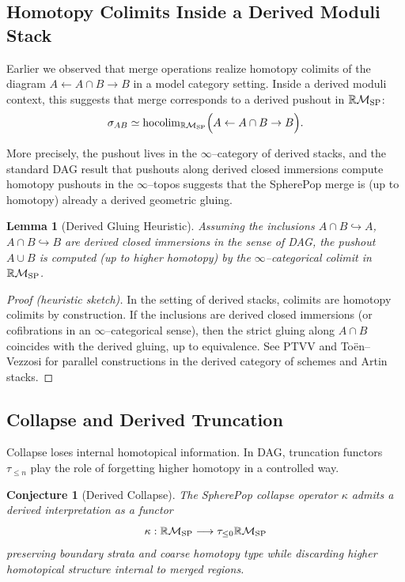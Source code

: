 \documentclass[12pt]{article}
\theoremstyle{plain}
\newtheorem{lemma}[theorem]{Lemma}
\newtheorem{conjecture_env}[theorem]{Conjecture}
\theoremstyle{definition}
\theoremstyle{remark}
\begin{document}
\subsection{Homotopy Colimits Inside a Derived Moduli Stack}

Earlier we observed that merge operations realize homotopy colimits of the
diagram $A \leftarrow A\cap B\rightarrow B$ in a model category setting.
Inside a derived moduli context, this suggests that merge corresponds to a
derived pushout in $\mathbb{R}\mathcal{M}_{\rm SP}$:
\[
    \sigma_{AB}
    \simeq
    \mathrm{hocolim}_{\mathbb{R}\mathcal{M}_{\rm SP}}
    \Bigl( A \leftarrow A\cap B \rightarrow B \Bigr).
\]

More precisely, the pushout lives in the $\infty$--category of derived stacks,
and the standard DAG result that pushouts along derived closed immersions
compute homotopy pushouts in the $\infty$--topos suggests that the SpherePop
merge is (up to homotopy) already a derived geometric gluing.


\begin{lemma}[Derived Gluing Heuristic]
Assuming the inclusions $A\cap B\hookrightarrow A$, $A\cap B\hookrightarrow B$
are derived closed immersions in the sense of DAG, the pushout
$A\cup B$ is computed (up to higher homotopy) by the $\infty$--categorical
colimit in $\mathbb{R}\mathcal{M}_{\rm SP}$.
\end{lemma}

\begin{proof}[Proof (heuristic sketch)]
In the setting of derived stacks, colimits are homotopy colimits by
construction. If the inclusions are derived closed immersions (or cofibrations
in an $\infty$--categorical sense), then the strict gluing along $A\cap B$
coincides with the derived gluing, up to equivalence. See PTVV and Toën--Vezzosi
for parallel constructions in the derived category of schemes and Artin stacks.
\end{proof}


\subsection{Collapse and Derived Truncation}

Collapse loses internal homotopical information. In DAG, truncation functors
$\tau_{\le n}$ play the role of forgetting higher homotopy in a controlled way.

\begin{conjecture_env}[Derived Collapse]
The SpherePop collapse operator $\kappa$ admits a derived interpretation as a
functor
\[
    \kappa : \mathbb{R}\mathcal{M}_{\rm SP}
    \longrightarrow
    \tau_{\le 0}\mathbb{R}\mathcal{M}_{\rm SP}
\]
preserving boundary strata and coarse homotopy type while discarding higher
homotopical structure internal to merged regions.
\end{conjecture_env}
\end{document}
